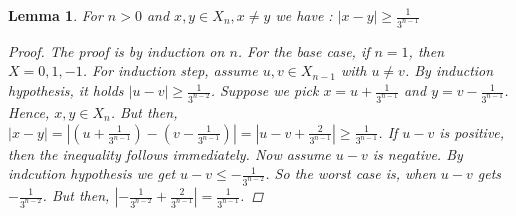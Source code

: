 \documentclass[12pt, a4paper]{scrartcl}
\newtheorem{lemma}[definition]{Lemma}
\begin{document}
\begin{lemma}
    For $n>0$ and $x,y \in X_n, x \neq y$ we have : $\left| x - y \right| \geq \frac{1}{3^{n-1}}$

    \begin{proof}
        The proof is by induction on $n$. For the base case, if $n=1$, then $X = {0,1,-1}$. For induction step, assume $u,v \in X_{n-1}$ with $u \neq v$. By induction hypothesis, it holds 
        $|u-v| \geq \frac{1}{3^{n-2}}$. Suppose we pick $x = u + \frac{1}{3^{n-1}}$ and $y = v - \frac{1}{3^{n-1}}$. Hence, $x,y \in X_n$. But then, $|x - y| = \left| (u + \frac{1}{3^{n-1}}) - (v - \frac{1}{3^{n-1}})\right| = \left| u - v + \frac{2}{3^{n-1}} \right| \geq \frac{1}{3^{n-1}}$. If $u-v$ is positive, 
        then the inequality follows immediately. Now assume $u-v$ is negative. By indcution hypothesis we get $u-v \leq -\frac{1}{3^{n-2}}$. So the worst case is, when $u-v$ gets $-\frac{1}{3^{n-2}}$.
        But then, $\left| -\frac{1}{3^{n-2}} + \frac{2}{3^{n-1}} \right| = \frac{1}{3^{n-1}}$.
    \end{proof}
\end{lemma}
\end{document}
